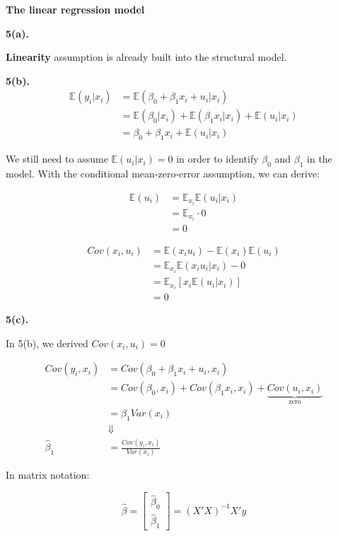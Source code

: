 \documentclass[UTF8]{ctexart}
\begin{document}
\newpage

\textbf{The linear regression model}
\par 

\textbf{5(a).}

\textbf{Linearity} assumption is already built into the structural model.

\textbf{5(b).}
\begin{align*}
    \mathbb{E}(y_i|x_i)&=\mathbb{E}(\beta_0+\beta_1x_i+u_i|x_i) \\
    &=\mathbb{E}(\beta_0|x_i)+\mathbb{E}(\beta_1x_i|x_i)+\mathbb{E}(u_i|x_i) \\
    &=\beta_0+\beta_1x_i+\mathbb{E}(u_i|x_i)
\end{align*}

We still need to assume $\mathbb{E}(u_i|x_i)=0$ in order to identify $\beta_0$ and $\beta_1$ 
in the model. With the conditional mean-zero-error assumption, we can derive:

\begin{align*}
    \mathbb{E}(u_i)&=\mathbb{E}_{x_i}\mathbb{E}(u_i|x_i) \\
    &=\mathbb{E}_{x_i} \cdot 0 \\
    &=0
\end{align*}

\begin{align*}
    Cov(x_i,u_i)&=\mathbb{E}(x_iu_i)-\mathbb{E}(x_i)\mathbb{E}(u_i) \\
    &=\mathbb{E}_{x_i}\mathbb{E}(x_iu_i|x_i)-0 \\
    &=\mathbb{E}_{x_i}[x_i\mathbb{E}(u_i|x_i)] \\
    &=0
\end{align*}
\par 

\textbf{5(c).}

In 5(b), we derived $Cov(x_i,u_i)=0$

\begin{align*}
    Cov(y_i,x_i)&=Cov(\beta_0+\beta_1x_i+u_i,x_i) \\
    &=Cov(\beta_0,x_i)+Cov(\beta_1x_i,x_i)+\underbrace{Cov(u_i,x_i)}_{\text{zero}} \\
    &=\beta_1Var(x_i) \\
    &\Downarrow \\
    \hat{\beta}_1&=\frac{Cov(y_i,x_i)}{Var(x_i)}
\end{align*}

In matrix notation:

\[\hat{\beta} =
\begin{bmatrix}
    \hat{\beta}_0 \\
    \hat{\beta}_1
\end{bmatrix}
= (X'X)^{-1}X'y \]
\par 
\end{document}
